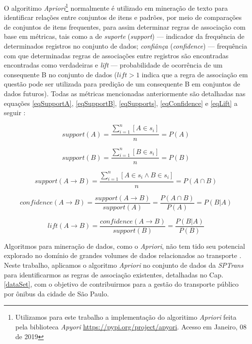 \documentclass[
	12pt,				%
	oneside,			%
	a4paper,			%
	english,			%
	brazil				%
	]{abntex2ppgsi}
\begin{document}
O algoritimo \textit{Apriori}\footnote{Utilizamos para este trabalho a implementação do algoritimo \textit{Apriori} feita pela biblioteca \textit{Apyori}  \url{https://pypi.org/project/apyori}. Acesso em Janeiro, 08 de 2019} normalmente é utilizado em mineração de texto para identificar relações entre conjuntos de itens e padrões, por meio de comparações de conjuntos de itens frequentes, para assim determinar regras de associação com base em métricas, tais como a de \textit{suporte} (\textit{support}) --- indicador da frequência de determinados registros no conjunto de dados; \textit{confiânça} (\textit{confidence}) --- frequência com que determinadas regras de associações entre registros são encontradas encontradas como verdadeiras e \textit{lift} --- probabilidade de ocorrência de um consequente B no conjunto de dados ($lift > 1$ indica que a regra de associação em questão pode ser utilizada para predição de um consequente B em conjuntos de dados futuros). Todas as métricas mencionadas anteriormente são detalhadas nas equações \ref{eqSupportA}, \ref{eqSupportB}, \ref{eqSupports}, \ref{eqConfidence} e  \ref{eqLift} a seguir  \cite{park2018apriori}:

\begin{equation}
\label{eqSupportA}
support(A) = \dfrac{\sum_{i=1}^{n}[A \in s_i]} {n} = P(A) 
\end{equation}

\begin{equation}
\label{eqSupportB}
support(B) = \dfrac{\sum_{i=1}^{n}[B \in s_i]} {n} = P(B) 
\end{equation}

\begin{equation}
\label{eqSupports}
support(A \rightarrow B) = \dfrac{\sum_{i=1}^{n}[A \in s_i \land B \in s_i]} {n} = P(A \cap B)
\end{equation}

\begin{equation}
\label{eqConfidence}
confidence(A \rightarrow B) = \dfrac{support(A \rightarrow B)}{support(A)} = \dfrac{P(A \cap B)}{P(A)} = P(B|A)
\end{equation}

\begin{equation}
\label{eqLift}
lift(A \rightarrow B) = \dfrac{confidence(A \rightarrow B)}{support(B)} = \dfrac{P(B|A)}{P(B)}
\end{equation}

Algoritmos para mineração de dados, como o \textit{Apriori}, não tem tido seu potencial explorado no domínio de grandes volumes de dados relacionados ao transporte \cite{park2018apriori}. Neste trabalho, aplicamos o algoritmo \textit{Apriori} no conjunto de dados da \textit{SPTrans} para identificarmos as regras de associação existentes, detalhadas no Cap. \ref{dataSet}, com o objetivo de contribuirmos para a gestão do transporte público por ônibus da cidade de São Paulo.   
\end{document}
